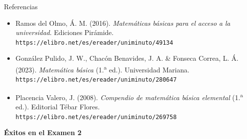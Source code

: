 \documentclass[aspectratio=169,10pt]{beamer}
\begin{document}
\begin{frame}{Referencias}
  \footnotesize
  \begin{itemize}
    \item[{[1]}] Ramos del Olmo, Á. M. (2016). \textit{Matemáticas básicas
      para el acceso a la universidad}. Ediciones Pirámide.
      \texttt{https://elibro.net/es/ereader/uniminuto/49134}
    \item[{[2]}] González Pulido, J. W., Chacón Benavides, J. A. \&
      Fonseca Correa, L. Á. (2023). \textit{Matemática básica} (1.\textsuperscript{a} ed.).
      Universidad Mariana.
      \texttt{https://elibro.net/es/ereader/uniminuto/280647}
    \item[{[3]}] Placencia Valero, J. (2008). \textit{Compendio de matemática
      básica elemental} (1.\textsuperscript{a} ed.). Editorial Tébar Flores.
      \texttt{https://elibro.net/es/ereader/uniminuto/269758}
  \end{itemize}

  \vspace{0.35cm}
  \begin{center}
    {\Large\color{uniAzul}\textbf{Éxitos en el Examen 2}}
  \end{center}
\end{frame}
\end{document}

